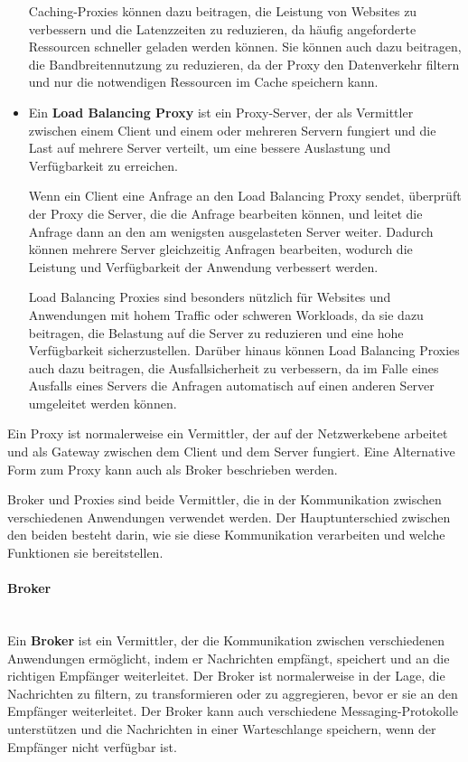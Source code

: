 \documentclass[../vs-script-first-v01.tex]{subfiles}
\begin{document}
\begin{itemize}
Caching-Proxies können dazu beitragen, die Leistung von Websites zu verbessern und die Latenzzeiten zu reduzieren, da häufig angeforderte Ressourcen schneller geladen werden können. Sie können auch dazu beitragen, die Bandbreitennutzung zu reduzieren, da der Proxy den Datenverkehr filtern und nur die notwendigen Ressourcen im Cache speichern kann.
\item Ein \textbf{Load Balancing Proxy} ist ein Proxy-Server, der als Vermittler zwischen einem Client und einem oder mehreren Servern fungiert und die Last auf mehrere Server verteilt, um eine bessere Auslastung und Verfügbarkeit zu erreichen.

Wenn ein Client eine Anfrage an den Load Balancing Proxy sendet, überprüft der Proxy die Server, die die Anfrage bearbeiten können, und leitet die Anfrage dann an den am wenigsten ausgelasteten Server weiter. Dadurch können mehrere Server gleichzeitig Anfragen bearbeiten, wodurch die Leistung und Verfügbarkeit der Anwendung verbessert werden.

Load Balancing Proxies sind besonders nützlich für Websites und Anwendungen mit hohem Traffic oder schweren Workloads, da sie dazu beitragen, die Belastung auf die Server zu reduzieren und eine hohe Verfügbarkeit sicherzustellen. Darüber hinaus können Load Balancing Proxies auch dazu beitragen, die Ausfallsicherheit zu verbessern, da im Falle eines Ausfalls eines Servers die Anfragen automatisch auf einen anderen Server umgeleitet werden können.
\end{itemize}
Ein Proxy ist normalerweise ein Vermittler, der  auf der Netzwerkebene arbeitet und als Gateway zwischen dem Client und dem Server fungiert. Eine Alternative Form zum Proxy kann auch als Broker beschrieben werden. 

Broker und Proxies sind beide Vermittler, die in der Kommunikation zwischen verschiedenen Anwendungen verwendet werden. Der Hauptunterschied zwischen den beiden besteht darin, wie sie diese Kommunikation verarbeiten und welche Funktionen sie bereitstellen.
\paragraph{Broker\\\\}
Ein \textbf{Broker} ist ein Vermittler, der die Kommunikation zwischen verschiedenen Anwendungen ermöglicht, indem er Nachrichten empfängt, speichert und an die richtigen Empfänger weiterleitet. Der Broker ist normalerweise in der Lage, die Nachrichten zu filtern, zu transformieren oder zu aggregieren, bevor er sie an den Empfänger weiterleitet. Der Broker kann auch verschiedene Messaging-Protokolle unterstützen und die Nachrichten in einer Warteschlange speichern, wenn der Empfänger nicht verfügbar ist. 
\end{document}
